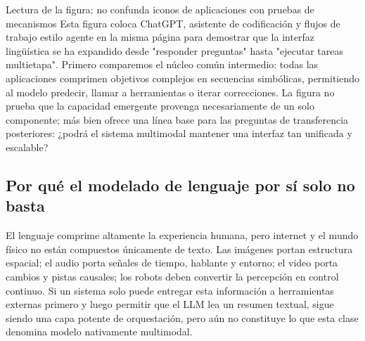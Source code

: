 
\begin{knowledgebox}{Lectura de la figura: no confunda iconos de aplicaciones con pruebas de mecanismos}
Esta figura coloca ChatGPT, asistente de codificación y flujos de trabajo estilo agente en la misma página para demostrar que la interfaz lingüística se ha expandido desde "responder preguntas" hasta "ejecutar tareas multietapa". Primero comparemos el núcleo común intermedio: todas las aplicaciones comprimen objetivos complejos en secuencias simbólicas, permitiendo al modelo predecir, llamar a herramientas o iterar correcciones. La figura no prueba que la capacidad emergente provenga necesariamente de un solo componente; más bien ofrece una línea base para las preguntas de transferencia posteriores: ¿podrá el sistema multimodal mantener una interfaz tan unificada y escalable?
\end{knowledgebox}


\subsection{Por qué el modelado de lenguaje por sí solo no basta}

El lenguaje comprime altamente la experiencia humana, pero internet y el mundo físico no están compuestos únicamente de texto. Las imágenes portan estructura espacial; el audio porta señales de tiempo, hablante y entorno; el video porta cambios y pistas causales; los robots deben convertir la percepción en control continuo. Si un sistema solo puede entregar esta información a herramientas externas primero y luego permitir que el LLM lea un resumen textual, sigue siendo una capa potente de orquestación, pero aún no constituye lo que esta clase denomina modelo nativamente multimodal.


